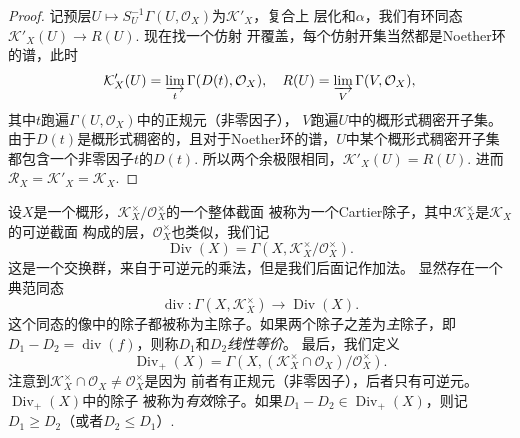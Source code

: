 \begin{proof}
    记预层$U\mapsto S_U^{-1}\Gamma(U,\mathcal O_X)$为$\mathcal K'_X$，复合上
    层化和$\alpha$，我们有环同态$\mathcal K'_X(U)\to R(U)$. 现在找一个仿射
    开覆盖，每个仿射开集当然都是Noether环的谱，此时
    \[
        \mathcal K'_X(U)=\varinjlim_{t} \Gamma(D(t),\mathcal O_X),\quad 
        R(U)=\varinjlim_{V} \Gamma(V,\mathcal O_X),
    \]
    其中$t$跑遍$\Gamma(U,\mathcal O_X)$中的正规元（非零因子），
    $V$跑遍$U$中的概形式稠密开子集。
    由于$D(t)$是概形式稠密的，且对于Noether环的谱，$U$中某个概形式稠密开子集
    都包含一个非零因子$t$的$D(t)$. 所以两个余极限相同，$\mathcal K'_X(U)=R(U)$.
    进而$\mathcal R_X=\mathcal K'_X=\mathcal K_X$.
\end{proof}

\begin{para}[Cartier除子]
    设$X$是一个概形，$\mathcal K_X^\times /\mathcal O_X^\times$的一个整体截面
    被称为一个Cartier除子，其中$\mathcal K_X^\times$是$\mathcal K_X$的可逆截面
    构成的层，$\mathcal O_X^\times$也类似，我们记
    \[
        \operatorname{Div}(X)=
        \Gamma(X,\mathcal K_X^\times /\mathcal O_X^\times).
    \]
    这是一个交换群，来自于可逆元的乘法，但是我们后面记作加法。
    显然存在一个典范同态
    \[
        \operatorname{div}:\Gamma(X,\mathcal K_X^\times)\to 
        \operatorname{Div}(X).
    \]
    这个同态的像中的除子都被称为主除子。如果两个除子之差为\textit{主}除子，即
    $D_1-D_2=\operatorname{div}(f)$，则称$D_1$和$D_2$\textit{线性等价}。
    最后，我们定义
    \[
        \operatorname{Div}_+(X)=
        \Gamma(X,(\mathcal K_X^\times \cap \mathcal O_X) /\mathcal O_X^\times).
    \]
    注意到$\mathcal K_X^\times \cap \mathcal O_X\neq \mathcal O_X^\times$是因为
    前者有正规元（非零因子），后者只有可逆元。$\operatorname{Div}_+(X)$中的除子
    被称为\textit{有效}除子。如果$D_1-D_2\in \operatorname{Div}_+(X)$，则记
    $D_1\geq D_2$（或者$D_2\leq D_1$）.
\end{para}

